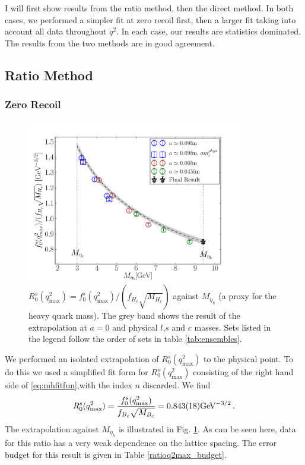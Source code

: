 I will first show results from the ratio method, then the direct method. In both cases, we performed a simpler fit at zero recoil first, then a larger fit taking into account all data throughout $q^2$.  In each case, our results are statistics dominated. The results from the two methods are in good agreement.

\subsection{Ratio Method}
\label{sec:ratiomethod}

\subsubsection{Zero Recoil}

\begin{figure}[htb!]
  \begin{center}
  \hspace{-10pt}
  \includegraphics[width=0.85\textwidth]{images/BsDs/ratio/f0fHc_vsmh.pdf}
  \caption{ $R_0^s(q^2_{\text{max}}) = f_0^s(q^2_{\text{max}})/(f_{H_c}\sqrt{M_{H_c}})$ against $M_{\eta_h}$ (a proxy for the heavy quark mass). The grey band shows the result of the extrapolation at $a=0$ and physical $l$,$s$ and $c$ masses. Sets listed in the legend follow the order of sets in table \ref{tab:ensembles}. \label{fig:ratioq2max}}
    \end{center}
\end{figure}

We performed an isolated extrapolation of $R^s_0(q^2_{\text{max}})$ to the physical point. To do this we used a simplified fit form for $R^s_0(q^2_{\text{max}})$ consisting of the right hand side of \eqref{eq:mhfitfun},with the index $n$ discarded. We find
\begin{align}
  R_0^s(q^2_{\text{max}}) = {f_0^s(q^2_{\text{max}})\over f_{B_c}\sqrt{M_{B_c}}} = 0.843(18) \text{GeV}^{-3/2}\,.
\end{align}
The extrapolation against $M_{\eta_h}$ is illustrated in Fig. \ref{fig:ratioq2max}. As can be seen here, data for this ratio has a very weak dependence on the lattice spacing. The error budget for this result is given in Table \ref{ratioq2max_budget}.


